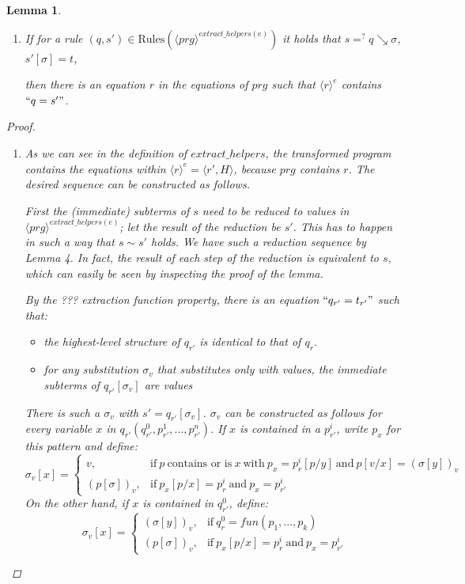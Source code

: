 \documentclass[11pt]{article} %
\newtheorem{lemma}{Lemma}
\begin{document}
\begin{lemma}
\begin{enumerate}
\item If for a rule $(q, s') \in \textrm{Rules}(\langle prg \rangle^{extract\_helpers(e)})$ it holds that $s =^? q \searrow \sigma$, $s'[\sigma] = t$,

then there is an equation $r$ in the equations of $prg$ such that $\langle r \rangle^e$ contains $`` q = s' "$.

\end{enumerate}

\begin{proof}

\begin{enumerate}

\item As we can see in the definition of $extract\_helpers$, the transformed program contains the equations within $\langle r \rangle^e = \big\langle r', H \big\rangle$, because $prg$ contains $r$. The desired sequence can be constructed as follows.

First the (immediate) subterms of $s$ need to be reduced to values in $\langle prg \rangle^{extract\_helpers(e)}$; let the result of the reduction be $s'$. This has to happen in such a way that $s \sim s'$ holds. We have such a reduction sequence by Lemma 4. In fact, the result of each step of the reduction is equivalent to $s$, which can easily be seen by inspecting the proof of the lemma.


By the ??? extraction function property, there is an equation $`` q_{r'} = t_{r'} "$ such that:
\begin{itemize}
\item the highest-level structure of $q_{r'}$ is identical to that of $q_r$.

\item for any substitution $\sigma_v$ that substitutes only with values, the immediate subterms of $q_{r'}[\sigma_v]$ are values
\end{itemize}
There is such a $\sigma_v$ with $s' = q_{r'}[\sigma_v]$. $\sigma_v$ can be constructed as follows for every variable $x$ in $q_{r'}(q^0_{r'}, p^1_{r'}, ..., p^n_{r'})$. If $x$ is contained in a $p^i_{r'}$, write $p_x$ for this pattern and define:
\begin{equation*}
    \sigma_v[x] =
    \begin{cases}
      v, & \text{if}\ p \ \text{contains or is}\ x \ \text{with}\ p_x = p^i_r[p / y] \ \text{and}\ p[v / x] = (\sigma[y])_v \\
      (p[\sigma])_v, & \text{if}\ p_x[p / x] = p^i_r \ \text{and}\ p_x = p^i_{r'}
    \end{cases}
\end{equation*}
On the other hand, if $x$ is contained in $q^0_{r'}$, define:
\begin{equation*}
    \sigma_v[x] =
    \begin{cases}
      (\sigma[y])_v, & \text{if}\ q^0_r = fun(p_1, ..., p_k) \\
      (p[\sigma])_v, & \text{if}\ p_x[p / x] = p^i_r \ \text{and}\ p_x = p^i_{r'}
    \end{cases}
\end{equation*}


\end{enumerate}
\end{proof}
\end{lemma}
\end{document}
